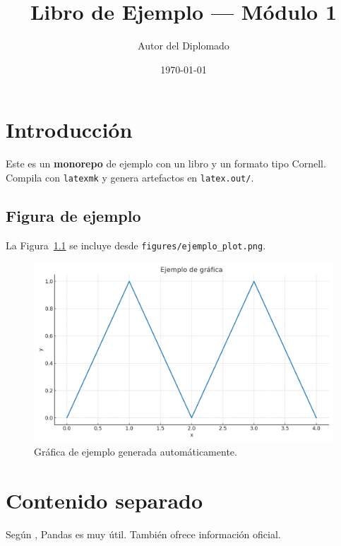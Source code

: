 \documentclass[12pt]{book}
\title{Libro de Ejemplo — Módulo 1}
\author{Autor del Diplomado}
\date{\today}
\begin{document}
\frontmatter
\maketitle

\tableofcontents

\mainmatter

\chapter{Introducción}
Este es un \textbf{monorepo} de ejemplo con un libro y un formato tipo Cornell.
Compila con \texttt{latexmk} y genera artefactos en \texttt{latex.out/}.

\section{Figura de ejemplo}
La Figura~\ref{fig:plot} se incluye desde \texttt{figures/ejemplo\_plot.png}.

\begin{figure}[h]
    \centering
    \includegraphics[width=0.7\linewidth]{ejemplo_plot.png}
    \caption{Gráfica de ejemplo generada automáticamente.}
    \label{fig:plot}
\end{figure}

\chapter{Contenido separado}






Según \textcite{mckinney2010}, Pandas es muy útil.
También \parencite{python_docs} ofrece información oficial.

\printbibliography


\backmatter
\end{document}

